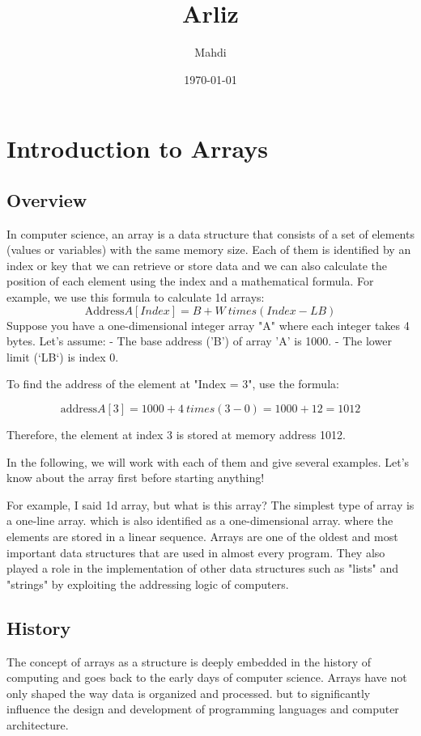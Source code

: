 \documentclass{book}
\title{{\Huge Arliz}}
\author{{\LARGE Mahdi}}
\date{{\large \today}}
\begin{document}
	
	\maketitle
	\tableofcontents
	
	\chapter{Introduction to Arrays}
	
	\section{Overview}
In computer science, an array is a data structure that consists of a set of elements (values ​​or variables) with the same memory size. Each of them is identified by an index or key that we can retrieve or store data and we can also calculate the position of each element using the index and a mathematical formula.
For example, we use this formula to calculate 1d arrays:
\[\text{Address} A[Index] = B + W \ times (Index - LB)\]
Suppose you have a one-dimensional integer array "A" where each integer takes 4 bytes. Let's assume:
- The base address ('B') of array 'A' is 1000.
- The lower limit (`LB`) is index 0.

To find the address of the element at "Index = 3", use the formula:

\[\text{address} A[3] = 1000 + 4 \ times (3 - 0) = 1000 + 12 = 1012\]

Therefore, the element at index 3 is stored at memory address 1012.

In the following, we will work with each of them and give several examples. Let's know about the array first before starting anything!

For example, I said 1d array, but what is this array?
The simplest type of array is a one-line array. which is also identified as a one-dimensional array. where the elements are stored in a linear sequence. Arrays are one of the oldest and most important data structures that are used in almost every program. They also played a role in the implementation of other data structures such as "lists" and "strings" by exploiting the addressing logic of computers.

	\section{History}
	
	The concept of arrays as a structure is deeply embedded in the history of computing and goes back to the early days of computer science. Arrays have not only shaped the way data is organized and processed. but to significantly influence the design and development of programming languages ​​and computer architecture.
	
\end{document}
